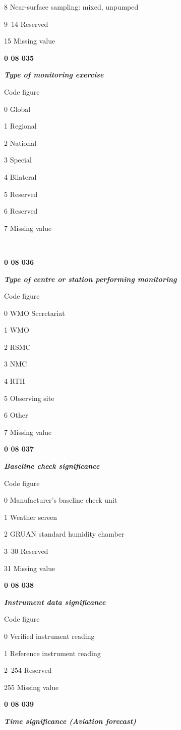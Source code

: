 8 Near-surface sampling: mixed, unpumped

9--14 Reserved

15 Missing value

\textbf{0 08 035}

\emph{\textbf{Type of monitoring exercise}}

Code figure

0 Global

1 Regional

2 National

3 Special

4 Bilateral

5 Reserved

6 Reserved

7 Missing value

\textbf{\\
}

\textbf{0 08 036}

\emph{\textbf{Type of centre or station performing monitoring}}

Code figure

0 WMO Secretariat

1 WMO

2 RSMC

3 NMC

4 RTH

5 Observing site

6 Other

7 Missing value

\textbf{0 08 037}

\emph{\textbf{Baseline check significance}}

Code figure

0 Manufacturer's baseline check unit

1 Weather screen

2 GRUAN standard humidity chamber

3--30 Reserved

31 Missing value

\textbf{0 08 038}

\emph{\textbf{Instrument data significance}}

Code figure

0 Verified instrument reading

1 Reference instrument reading

2--254 Reserved

255 Missing value

\textbf{0 08 039}

\emph{\textbf{Time significance (Aviation forecast)}}

